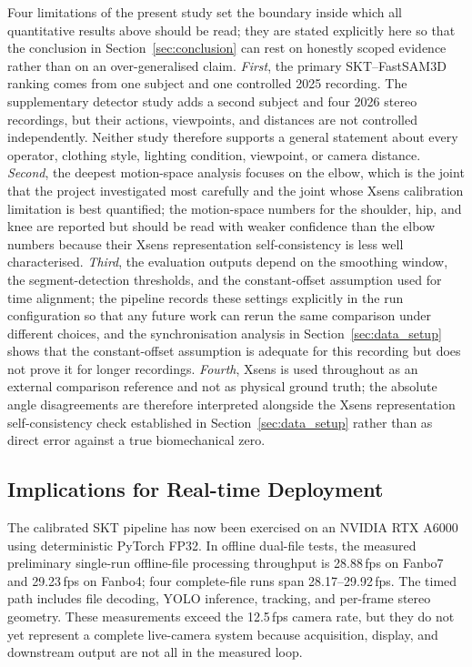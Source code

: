 \documentclass[12pt,a4paper]{article}
\begin{document}
Four limitations of the present study set the boundary inside which all
quantitative results above should be read; they are stated explicitly here
so that the conclusion in Section~\ref{sec:conclusion} can rest on
honestly scoped evidence rather than on an over-generalised claim.
\emph{First}, the primary SKT--FastSAM3D ranking comes from one subject and
one controlled 2025 recording.  The supplementary detector study adds a
second subject and four 2026 stereo recordings, but their actions,
viewpoints, and distances are not controlled independently.  Neither study
therefore supports a general statement about every operator, clothing style,
lighting condition, viewpoint, or camera distance.
\emph{Second}, the deepest motion-space analysis focuses on the elbow,
which is the joint that the project investigated most carefully and the
joint whose Xsens calibration limitation is best quantified; the
motion-space numbers for the shoulder, hip, and knee are reported but
should be read with weaker confidence than the elbow numbers because
their Xsens representation self-consistency is less well characterised.
\emph{Third}, the evaluation outputs depend on the smoothing window, the
segment-detection thresholds, and the constant-offset assumption used for
time alignment; the pipeline records these settings explicitly in the run
configuration so that any future work can rerun the same comparison under
different choices, and the synchronisation analysis in
Section~\ref{sec:data_setup} shows that the constant-offset assumption is
adequate for this recording but does not prove it for longer recordings.
\emph{Fourth}, Xsens is used throughout as an external comparison
reference and not as physical ground truth; the absolute angle disagreements are
therefore interpreted alongside the Xsens representation self-consistency
check established in Section~\ref{sec:data_setup} rather than as direct error
against a true biomechanical zero.

\subsection{Implications for Real-time Deployment}

The calibrated SKT pipeline has now been exercised on an NVIDIA RTX A6000
using deterministic PyTorch FP32.  In offline dual-file tests, the measured
preliminary single-run offline-file processing throughput is 28.88\,fps on
Fanbo7 and 29.23\,fps on Fanbo4; four complete-file runs span
28.17--29.92\,fps.  The timed path includes file decoding, YOLO inference,
tracking, and per-frame stereo geometry.  These measurements exceed the
12.5\,fps camera rate, but they do not yet represent a complete live-camera
system because acquisition, display, and downstream output are not all in
the measured loop.
\end{document}
